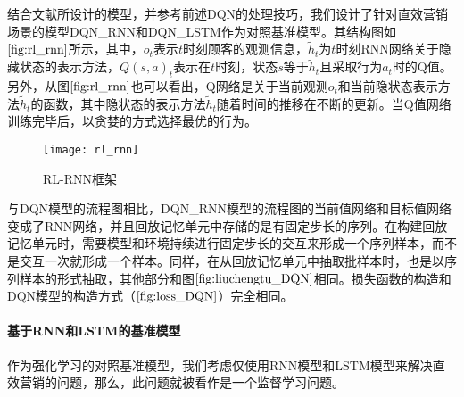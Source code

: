 
结合文献\citep{hausknecht2015deep,narasimhan2015language}所设计的模型，并参考前述DQN的处理技巧，我们设计了针对直效营销场景的模型DQN\_RNN和DQN\_LSTM作为对照基准模型。其结构图如$\ref{fig:rl_rnn}$所示，其中，$o_{t}$表示$t$时刻顾客的观测信息，$\tilde{h}_{t}$为$t$时刻RNN网络关于隐藏状态的表示方法，$Q(s,a)_{t}$表示在$t$时刻，状态$s$等于$\tilde{h}_{t}$且采取行为$a_{t}$时的Q值。另外，从图$\ref{fig:rl_rnn}$也可以看出，Q网络是关于当前观测$o_{t}$和当前隐状态表示方法$\tilde{h}_{t}$的函数，其中隐状态的表示方法$\tilde{h}_{t}$随着时间的推移在不断的更新。当Q值网络训练完毕后，以贪婪的方式选择最优的行为。
\begin{figure}[htbp]
\centering
\texttt{[image: rl\_rnn]}
\caption{RL-RNN框架}
\label{fig:rl_rnn}
\end{figure}

与DQN模型的流程图相比，DQN\_RNN模型的流程图的当前值网络和目标值网络变成了RNN网络，并且回放记忆单元中存储的是有固定步长的序列。在构建回放记忆单元时，需要模型和环境持续进行固定步长的交互来形成一个序列样本，而不是交互一次就形成一个样本。同样，在从回放记忆单元中抽取批样本时，也是以序列样本的形式抽取，其他部分和图$\ref{fig:liuchengtu_DQN}$相同。损失函数的构造和DQN模型的构造方式（$\ref{fig:loss_DQN}$）完全相同。


 \paragraph{基于RNN和LSTM的基准模型}
 作为强化学习的对照基准模型，我们考虑仅使用RNN模型和LSTM模型来解决直效营销的问题，那么，此问题就被看作是一个监督学习问题。

